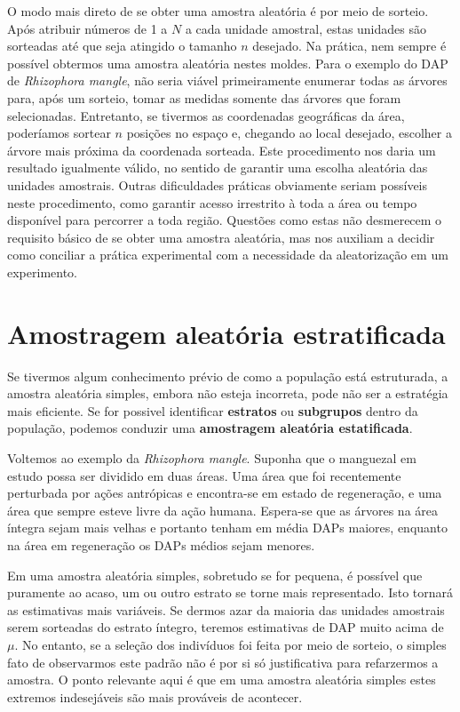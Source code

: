 \documentclass[
]{book}
\begin{document}
O modo mais direto de se obter uma amostra aleatória é por meio de sorteio. Após atribuir números de 1 a \(N\) a cada unidade amostral, estas unidades são sorteadas até que seja atingido o tamanho \(n\) desejado. Na prática, nem sempre é possível obtermos uma amostra aleatória nestes moldes. Para o exemplo do DAP de \emph{Rhizophora mangle}, não seria viável primeiramente enumerar todas as árvores para, após um sorteio, tomar as medidas somente das árvores que foram selecionadas. Entretanto, se tivermos as coordenadas geográficas da área, poderíamos sortear \(n\) posições no espaço e, chegando ao local desejado, escolher a árvore mais próxima da coordenada sorteada. Este procedimento nos daria um resultado igualmente válido, no sentido de garantir uma escolha aleatória das unidades amostrais. Outras dificuldades práticas obviamente seriam possíveis neste procedimento, como garantir acesso irrestrito à toda a área ou tempo disponível para percorrer a toda região. Questões como estas não desmerecem o requisito básico de se obter uma amostra aleatória, mas nos auxiliam a decidir como conciliar a prática experimental com a necessidade da aleatorização em um experimento.

\hypertarget{amostragem-aleatuxf3ria-estratificada}{%
\section{Amostragem aleatória estratificada}\label{amostragem-aleatuxf3ria-estratificada}}

Se tivermos algum conhecimento prévio de como a população está estruturada, a amostra aleatória simples, embora não esteja incorreta, pode não ser a estratégia mais eficiente. Se for possivel identificar \textbf{estratos} ou \textbf{subgrupos} dentro da população, podemos conduzir uma \textbf{amostragem aleatória estatificada}.

Voltemos ao exemplo da \emph{Rhizophora mangle}. Suponha que o manguezal em estudo possa ser dividido em duas áreas. Uma área que foi recentemente perturbada por ações antrópicas e encontra-se em estado de regeneração, e uma área que sempre esteve livre da ação humana. Espera-se que as árvores na área íntegra sejam mais velhas e portanto tenham em média DAPs maiores, enquanto na área em regeneração os DAPs médios sejam menores.

Em uma amostra aleatória simples, sobretudo se for pequena, é possível que puramente ao acaso, um ou outro estrato se torne mais representado. Isto tornará as estimativas mais variáveis. Se dermos azar da maioria das unidades amostrais serem sorteadas do estrato íntegro, teremos estimativas de DAP muito acima de \(\mu\). No entanto, se a seleção dos indivíduos foi feita por meio de sorteio, o simples fato de observarmos este padrão não é por si só justificativa para refarzermos a amostra. O ponto relevante aqui é que em uma amostra aleatória simples estes extremos indesejáveis são mais prováveis de acontecer.
\end{document}
